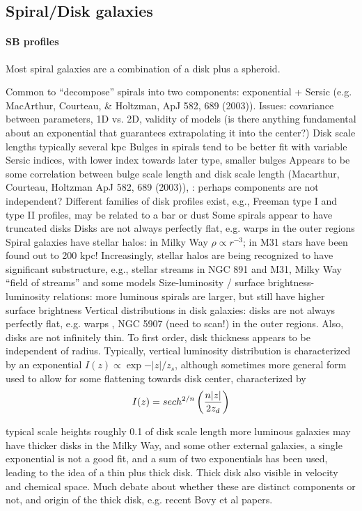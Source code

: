 \documentclass{article}
\begin{document}
\subsection{Spiral/Disk galaxies}

\paragraph{SB profiles}

Most spiral galaxies are a combination of a disk plus a spheroid.

Common to ``decompose'' spirals into two components: exponential + Sersic
(e.g. MacArthur, Courteau, \& Holtzman, ApJ 582, 689 (2003)). Issues:
covariance between parameters, 1D vs. 2D, validity of models (is there
anything fundamental about an exponential that guarantees extrapolating it
into the center?)
Disk scale lengths typically several kpc
Bulges in spirals tend to be better fit with variable Sersic indices, with
lower index towards later type, smaller bulges
Appears to be some correlation between bulge scale length and disk scale
length (Macarthur, Courteau, Holtzman ApJ 582, 689 (2003)), : perhaps
components are not independent?
Different families of disk profiles exist, e.g., Freeman type I and type II
profiles, may be related to a bar or dust
Some spirals appear to have truncated disks
Disks are not always perfectly flat, e.g. warps in the outer regions
Spiral galaxies have stellar halos: in Milky Way  $\rho \propto r^{-3}$; in
M31 stars have been found out to 200 kpc! Increasingly, stellar halos are
being recognized to have significant substructure, e.g., stellar streams in
NGC 891 and M31, Milky Way ``field of streams'' and some models
Size-luminosity / surface brightness-luminosity relations: more luminous
spirals are larger, but still have higher surface brightness
Vertical distributions in disk galaxies: disks are not always perfectly
flat, e.g. warps , NGC 5907 (need to scan!) in the outer regions. Also,
disks are not infinitely thin. To first order, disk thickness appears to be
independent of radius. Typically, vertical luminosity distribution is
characterized by an exponential  $I(z) \propto \exp{-\vert z\vert/z_s}$,
although sometimes more general form used to allow for some flattening
towards disk center, characterized by
\begin{displaymath}I(z) = sech^{2/n} \left({n\vert z\vert\over
2z_d}\right)\end{displaymath}

typical scale heights roughly 0.1 of disk scale length
more luminous galaxies may have thicker disks
in the Milky Way, and some other external galaxies, a single exponential is
not a good fit, and a sum of two exponentials has been used, leading to the
idea of a thin plus thick disk. Thick disk also visible in velocity and
chemical space. Much debate about whether these are distinct components or
not, and origin of the thick disk, e.g. recent Bovy et al papers.
\end{document}
